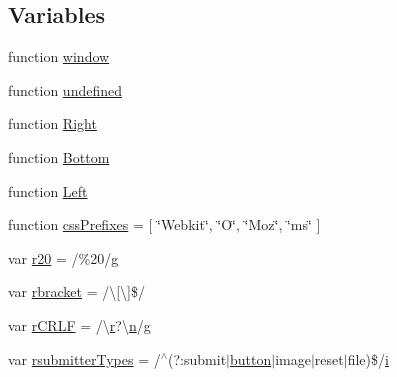\subsection*{Variables}
\begin{DoxyCompactItemize}
\item 
function \hyperlink{obj_2_release_2_package_2_package_tmp_2_scripts_2jquery-1_810_82_8js_a04a8a2bbfa9c15500892b8e5033d625b}{window}
\item 
function \hyperlink{obj_2_release_2_package_2_package_tmp_2_scripts_2jquery-1_810_82_8js_a08113a236cc18d2a9d5ce27e638012be}{undefined}
\item 
function \hyperlink{obj_2_release_2_package_2_package_tmp_2_scripts_2jquery-1_810_82_8js_ac7f66efc33d974809d85fc5bdb00c6eb}{Right}
\item 
function \hyperlink{obj_2_release_2_package_2_package_tmp_2_scripts_2jquery-1_810_82_8js_aff76c1cba4a00c678dfce0e0c5a5538a}{Bottom}
\item 
function \hyperlink{obj_2_release_2_package_2_package_tmp_2_scripts_2jquery-1_810_82_8js_abef68bf244a1159a49fe3a2c153a65d2}{Left}
\item 
function \hyperlink{obj_2_release_2_package_2_package_tmp_2_scripts_2jquery-1_810_82_8js_a2ed3892172b336458b8074254f4471da}{css\+Prefixes} = \mbox{[} \char`\"{}Webkit\char`\"{}, \char`\"{}O\char`\"{}, \char`\"{}Moz\char`\"{}, \char`\"{}ms\char`\"{} \mbox{]}
\item 
var \hyperlink{obj_2_release_2_package_2_package_tmp_2_scripts_2jquery-1_810_82_8js_a0e39f72d512af99fb5992d66f1a1c821}{r20} = /\%20/\hyperlink{_scripts_2respond_8min_8js_a103df269476e78897c9c4c6cb8f4eb06}{g}
\item 
var \hyperlink{obj_2_release_2_package_2_package_tmp_2_scripts_2jquery-1_810_82_8js_a07117e28ee58d2d2664cfbaf741e10c1}{rbracket} = /\textbackslash{}\mbox{[}\textbackslash{}\mbox{]}\$/
\item 
var \hyperlink{obj_2_release_2_package_2_package_tmp_2_scripts_2jquery-1_810_82_8js_a4fd9dfc4eb645b441a3e84730c50154b}{r\+C\+R\+LF} = /\textbackslash{}\hyperlink{_scripts_2ai_80_822_89-build00167_8min_8js_a07c0e0a63b5b484807c0331c78558c9e}{r}?\textbackslash{}\hyperlink{_scripts_2ai_80_822_89-build00167_8min_8js_afc984c4f6c68ce30a0af99006f5f8d27}{n}/\hyperlink{_scripts_2respond_8min_8js_a103df269476e78897c9c4c6cb8f4eb06}{g}
\item 
var \hyperlink{obj_2_release_2_package_2_package_tmp_2_scripts_2jquery-1_810_82_8js_a0e9cd4ca08945afe827846f34a36c74a}{rsubmitter\+Types} = /$^\wedge$(?\+:submit$\vert$\hyperlink{_scripts_2bootstrap_8min_8js_a55e170814e74f6c3db8ae9ea3ba9054f}{button}$\vert$image$\vert$reset$\vert$file)\$/\hyperlink{_scripts_2respond_8min_8js_a5e25b1d1bed9ab5f3174b76d6a722180}{i}

\end{DoxyCompactItemize}
